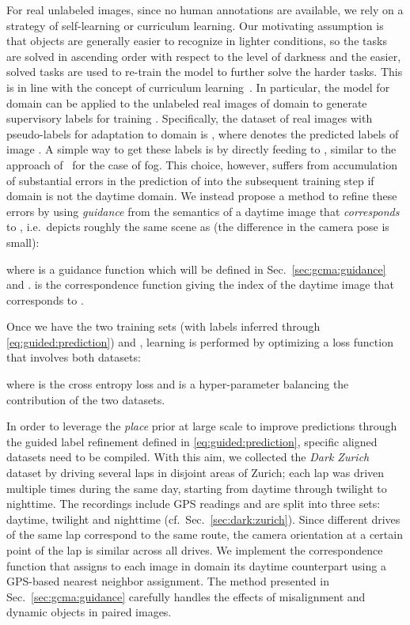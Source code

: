 \documentclass[10pt,twocolumn,letterpaper]{article}
\begin{document}
For real unlabeled images, since no human annotations are available, we rely on a strategy of self-learning or curriculum learning. Our motivating assumption is that objects are generally easier to recognize in lighter conditions, so the tasks are solved in ascending order with respect to the level of darkness and the easier, solved tasks are used to re-train the model to further solve the harder tasks. This is in line with the concept of curriculum learning~\cite{curriculum:learning}.  
In particular, the model  for domain  can be applied to the unlabeled real images of domain  to generate supervisory labels for training . Specifically, the dataset of real images with pseudo-labels for adaptation to domain  is , where  denotes the predicted labels of image . A simple way to get these labels is by directly feeding  to , similar to the approach of~\cite{SynRealDataFogECCV18,CMAda:IJCV2019} for the case of fog. This choice, however, suffers from accumulation of substantial errors in the prediction of  into the subsequent training step if domain  is not the daytime domain. We instead propose a method to refine these errors by using \emph{guidance} from the semantics of a daytime image  that \emph{corresponds} to , i.e.\ depicts roughly the same scene as  (the difference in the camera pose is small):

where  is a guidance function which will be defined in Sec.~\ref{sec:gcma:guidance} and .  is the correspondence function giving the index of the daytime image that corresponds to .

Once we have the two training sets  (with labels inferred through \eqref{eq:guided:prediction}) and , learning  is performed by optimizing a loss function that involves both datasets:

where  is the cross entropy loss and  is a hyper-parameter balancing the contribution of the two datasets.

In order to leverage the \emph{place} prior at large scale to improve predictions through the guided label refinement defined in \eqref{eq:guided:prediction}, specific aligned datasets need to be compiled. With this aim, we collected the \emph{Dark Zurich} dataset by driving several laps in disjoint areas of Zurich; each lap was driven multiple times during the same day, starting from daytime through twilight to nighttime. The recordings include GPS readings and are split into three sets: daytime, twilight and nighttime (cf.\ Sec.~\ref{sec:dark:zurich}). Since different drives of the same lap correspond to the same route, the camera orientation at a certain point of the lap is similar across all drives. We implement the correspondence function  that assigns to each image in domain  its daytime counterpart using a GPS-based nearest neighbor assignment. The method presented in Sec.~\ref{sec:gcma:guidance} carefully handles the effects of misalignment and dynamic objects in paired images.
\end{document}
